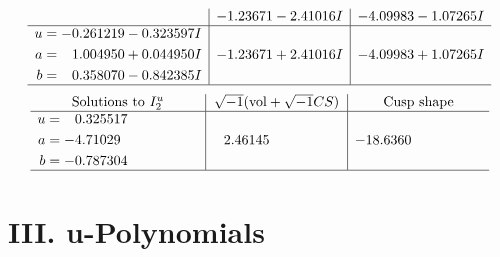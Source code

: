 \documentclass[1p]{elsarticle_modified}
\theoremstyle{definition}
\newcommand{\I}{\sqrt{-1}}
\begin{document}
$$\begin{array}{c|c|c}
 & -1.23671 - 2.41016 I & -4.09983 - 1.07265 I \\ \hline\begin{aligned}
u &= -0.261219 - 0.323597 I \\
a &= \phantom{-}1.004950 + 0.044950 I \\
b &= \phantom{-}0.358070 - 0.842385 I\end{aligned}
 & -1.23671 + 2.41016 I & -4.09983 + 1.07265 I\\
 \hline 
 \end{array}$$\newpage$$\begin{array}{c|c|c}  
\text{Solutions to }I^u_{2}& \I (\text{vol} + \sqrt{-1}CS) & \text{Cusp shape}\\
 \hline 
\begin{aligned}
u &= \phantom{-}0.325517\phantom{ +0.000000I} \\
a &= -4.71029\phantom{ +0.000000I} \\
b &= -0.787304\phantom{ +0.000000I}\end{aligned}
 & \phantom{-}2.46145\phantom{ +0.000000I} & -18.6360\phantom{ +0.000000I}\\
 \hline 
 \end{array}$$\newpage
\newpage\renewcommand{\arraystretch}{1}
\centering \section*{ III. u-Polynomials}
\end{document}
